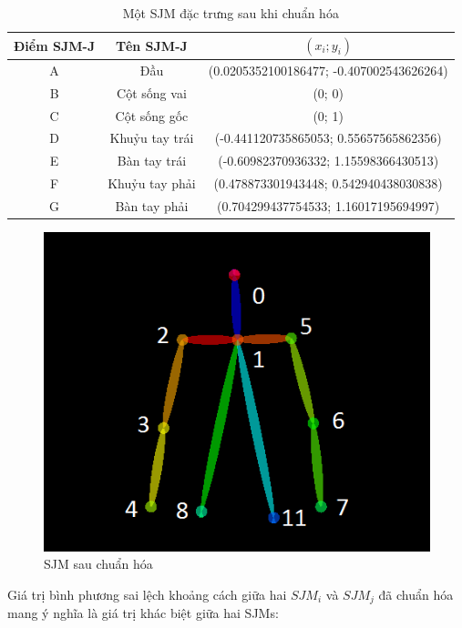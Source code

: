 \begin{table}[htbp]
\centering
\caption{Một SJM đặc trưng sau khi chuẩn hóa}
\begin{tabular}{|c|c|c|}
\hline 
 Điểm SJM-J & Tên SJM-J & $(x_i; y_i) $\\ 
\hline 
A & Đầu  & (0.0205352100186477; -0.407002543626264) \\ 
\hline 
B & Cột sống vai & (0; 0) \\ 
\hline 	
C & Cột sống gốc & (0; 1) \\ 
\hline 
D & Khuỷu tay trái & (-0.441120735865053; 0.55657565862356) \\ 
\hline 
E & Bàn tay trái & (-0.60982370936332; 1.15598366430513) \\ 
\hline
F & Khuỷu tay phải & (0.478873301943448; 0.542940438030838) \\ 
\hline
G & Bàn tay phải & (0.704299437754533; 1.16017195694997) \\ 
\hline 
\end{tabular} 
\label{BangSJMResult}
\end{table}


    \begin{figure}[htp]
    \begin{center}
     \includegraphics[scale=0.6]{chap4/c4_figs/joints_choose.png}
    \end{center}
    \caption{SJM sau chuẩn hóa} 
    \label{figure48}
    \end{figure}



Giá trị bình phương sai lệch khoảng cách giữa hai $SJM_i$ và $SJM_j$ đã chuẩn hóa mang ý nghĩa là giá trị khác biệt giữa hai SJMs:

